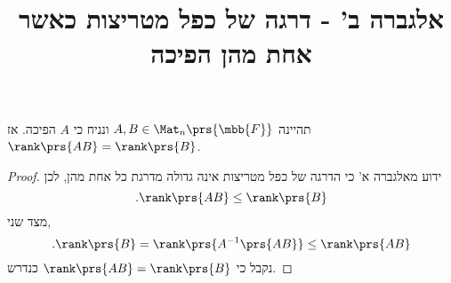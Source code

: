 \documentclass[a4paper,10pt,twoside,openany]{article}
\title{
אלגברה ב' - דרגה של כפל מטריצות כאשר אחת מהן הפיכה
}
\date{}
\begin{document}
\maketitle

\begin{propositionstarred}
תהיינה
$A,B \in \Mat_n\prs{\mbb{F}}$
ונניח כי
$A$
הפיכה.
אז
$\rank\prs{AB} = \rank\prs{B}$.
\end{propositionstarred}

\begin{proof}
ידוע מאלגברה א' כי הדרגה של כפל מטריצות אינה גדולה מדרגת כל אחת מהן, לכן
\[\text{.} \rank\prs{AB} \leq \rank\prs{B}\]
מצד שני,
\[\text{.} \rank\prs{B} = \rank\prs{A^{-1} \prs{AB}} \leq \rank\prs{AB}\]
נקבל כי
$\rank\prs{AB} = \rank\prs{B}$
כנדרש.
\end{proof}
\end{document}
